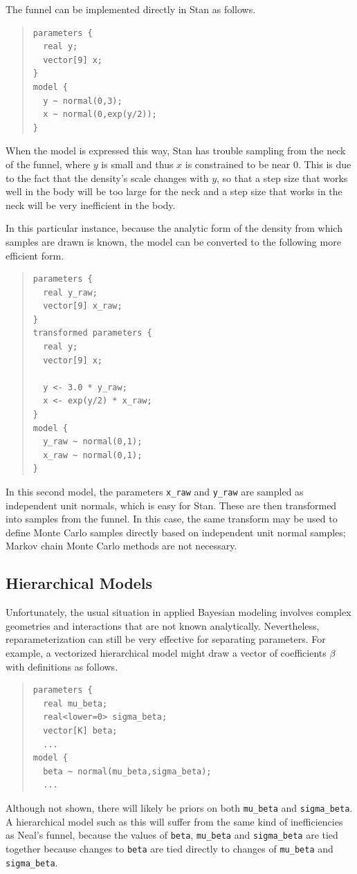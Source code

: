 The funnel can be implemented directly in Stan as follows.
%
\begin{quote}
\begin{Verbatim}
parameters {  
  real y;
  vector[9] x;
}
model {
  y ~ normal(0,3);
  x ~ normal(0,exp(y/2));
}
\end{Verbatim}
\end{quote}
%
When the model is expressed this way, Stan has trouble sampling from
the neck of the funnel, where $y$ is small and thus $x$ is constrained
to be near 0.  This is due to the fact that the density's scale
changes with $y$, so that a step size that works well in the body will
be too large for the neck and a step size that works in the neck will be
very inefficient in the body.

In this particular instance, because the analytic form of the density
from which samples are drawn is known, the model can be converted to
the following more efficient form.
%
\begin{quote}
\begin{Verbatim}
parameters {  
  real y_raw;
  vector[9] x_raw;
}
transformed parameters {
  real y;
  vector[9] x;

  y <- 3.0 * y_raw;
  x <- exp(y/2) * x_raw;
}
model {
  y_raw ~ normal(0,1);
  x_raw ~ normal(0,1);
}
\end{Verbatim}
\end{quote}
%
In this second model, the parameters \Verb|x_raw| and \Verb|y_raw| are
sampled as independent unit normals, which is easy for Stan.  These
are then transformed into samples from the funnel.  In this case, the
same transform may be used to define Monte Carlo samples directly
based on independent unit normal samples; Markov chain Monte Carlo
methods are not necessary.  

\subsection{Hierarchical Models}

Unfortunately, the usual situation in applied Bayesian modeling
involves complex geometries and interactions that are not known
analytically.  Nevertheless, reparameterization can still be very
effective for separating parameters.  For example, a vectorized
hierarchical model might draw a vector of coefficients $\beta$ with
definitions as follows.
%
\begin{quote}
\begin{Verbatim}
parameters {
  real mu_beta;   
  real<lower=0> sigma_beta;
  vector[K] beta;
  ...
model {
  beta ~ normal(mu_beta,sigma_beta);
  ...
\end{Verbatim}
\end{quote}
%
Although not shown, there will likely be priors on both \Verb|mu_beta|
and \Verb|sigma_beta|.  A hierarchical model such as this will suffer
from the same kind of inefficiencies as Neal's funnel, because the
values of \Verb|beta|, \Verb|mu_beta| and \Verb|sigma_beta| are tied
together because changes to \Verb|beta| are tied directly to changes
of \Verb|mu_beta| and \Verb|sigma_beta|.

